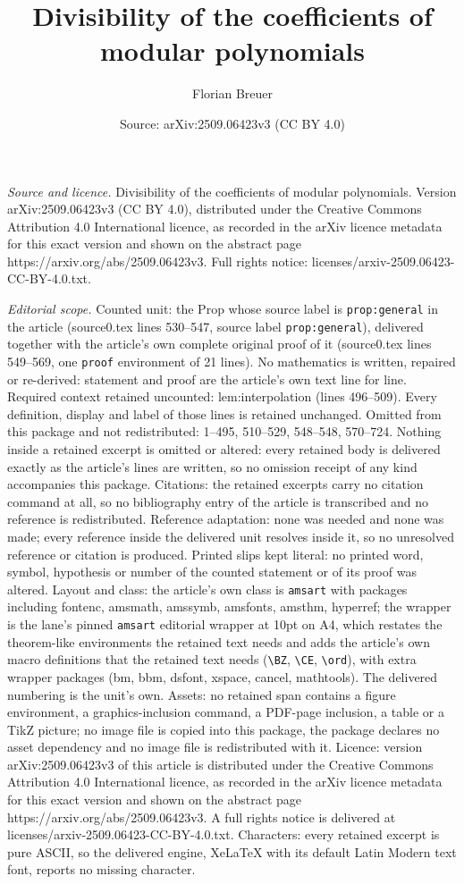 \documentclass[10pt,a4paper]{amsart}
\title[Divisibility of the coefficients of modular polynomials]{Divisibility of the coefficients of modular polynomials}
\author{Florian Breuer}
\date{Source: arXiv:2509.06423v3 (CC BY 4.0)}
\begin{document}
\maketitle

\noindent\emph{Source and licence.} Divisibility of the coefficients of modular polynomials. Version arXiv:2509.06423v3 (CC BY 4.0), distributed under the Creative Commons Attribution 4.0 International licence, as recorded in the arXiv licence metadata for this exact version and shown on the abstract page https://arxiv.org/abs/2509.06423v3. Full rights notice: licenses/arxiv-2509.06423-CC-BY-4.0.txt.\par\smallskip

\noindent\textit{Editorial scope.} Counted unit: the Prop whose source label is \texttt{prop:general} in the article (source0.tex lines 530--547, source label \texttt{prop:general}), delivered together with the article's own complete original proof of it (source0.tex lines 549--569, one \texttt{proof} environment of 21 lines). No mathematics is written, repaired or re-derived: statement and proof are the article's own text line for line. Required context retained uncounted: lem:interpolation (lines 496--509). Every definition, display and label of those lines is retained unchanged. Omitted from this package and not redistributed: 1--495, 510--529, 548--548, 570--724. Nothing inside a retained excerpt is omitted or altered: every retained body is delivered exactly as the article's lines are written, so no omission receipt of any kind accompanies this package. Citations: the retained excerpts carry no citation command at all, so no bibliography entry of the article is transcribed and no reference is redistributed. Reference adaptation: none was needed and none was made; every reference inside the delivered unit resolves inside it, so no unresolved reference or citation is produced. Printed slips kept literal: no printed word, symbol, hypothesis or number of the counted statement or of its proof was altered. Layout and class: the article's own class is \texttt{amsart} with packages including fontenc, amsmath, amssymb, amsfonts, amsthm, hyperref; the wrapper is the lane's pinned \texttt{amsart} editorial wrapper at 10pt on A4, which restates the theorem-like environments the retained text needs and adds the article's own macro definitions that the retained text needs (\texttt{\textbackslash BZ}, \texttt{\textbackslash CE}, \texttt{\textbackslash ord}), with extra wrapper packages (bm, bbm, dsfont, xspace, cancel, mathtools). The delivered numbering is the unit's own. Assets: no retained span contains a figure environment, a graphics-inclusion command, a PDF-page inclusion, a table or a TikZ picture; no image file is copied into this package, the package declares no asset dependency and no image file is redistributed with it. Licence: version arXiv:2509.06423v3 of this article is distributed under the Creative Commons Attribution 4.0 International licence, as recorded in the arXiv licence metadata for this exact version and shown on the abstract page https://arxiv.org/abs/2509.06423v3. A full rights notice is delivered at licenses/arxiv-2509.06423-CC-BY-4.0.txt. Characters: every retained excerpt is pure ASCII, so the delivered engine, XeLaTeX with its default Latin Modern text font, reports no missing character.
\end{document}
